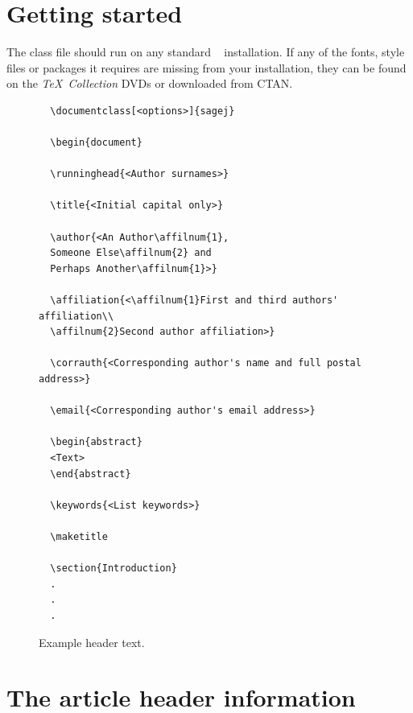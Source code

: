\documentclass[Afour,sageh,times]{includes/tex/sagej}
\begin{document}
\section{Getting started}

The \textsf{\journalclassshort} class file should run on any standard
\LaTeXe~ installation. If any of the fonts, style files or packages it
requires are missing from your installation, they can be found on the
\textit{\TeX\ Collection} DVDs or downloaded from CTAN.

\begin{figure}
  \setlength{\fboxsep}{0pt}%
  \setlength{\fboxrule}{0pt}%
  \begin{center}
  \begin{verbatim}
  \documentclass[<options>]{sagej}

  \begin{document}

  \runninghead{<Author surnames>}

  \title{<Initial capital only>}

  \author{<An Author\affilnum{1},
  Someone Else\affilnum{2} and
  Perhaps Another\affilnum{1}>}

  \affiliation{<\affilnum{1}First and third authors' affiliation\\
  \affilnum{2}Second author affiliation>}

  \corrauth{<Corresponding author's name and full postal address>}

  \email{<Corresponding author's email address>}

  \begin{abstract}
  <Text>
  \end{abstract}

  \keywords{<List keywords>}

  \maketitle

  \section{Introduction}
  .
  .
  .
  \end{verbatim}
  \end{center}
  \caption{Example header text.\label{F1}}
\end{figure}

\section{The article header information}
\end{document}

